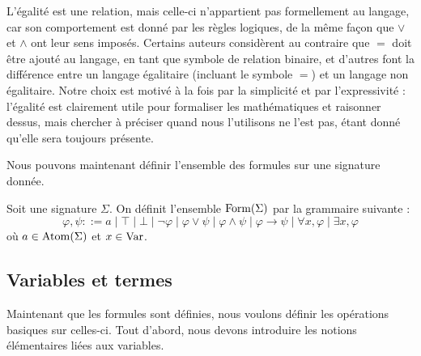 \begin{remark}
  L'égalité est une relation, mais celle-ci n'appartient pas formellement au
  langage, car son comportement est donné par les règles logiques, de la même
  façon que $\lor$ et $\land$ ont leur sens imposés. Certains auteurs considèrent
  au contraire que $=$ doit être ajouté au langage, en tant que symbole de
  relation binaire, et d'autres font la différence entre un langage égalitaire
  (incluant le symbole $=$) et un langage non égalitaire. Notre choix est motivé
  à la fois par la simplicité et par l'expressivité : l'égalité est clairement
  utile pour formaliser les mathématiques et raisonner dessus, mais chercher à
  préciser quand nous l'utilisons ne l'est pas, étant donné qu'elle sera toujours
  présente.
\end{remark}

Nous pouvons maintenant définir l'ensemble des formules sur une signature donnée.

\begin{definition}[Formules]
  Soit une signature $\Sigma$. On définit l'ensemble $\operatorname{Form}(\Sigma)$ par
  la grammaire suivante :
  \[\varphi,\psi ::= a\mid \top\mid\bot\mid\lnot\varphi\mid\varphi\lor\psi\mid
  \varphi\land\psi\mid \varphi\to\psi\mid\forall x,\varphi\mid\exists x,\varphi\]
  où $a\in \operatorname{Atom}(\Sigma)$ et $x\in \operatorname{Var}$.
\end{definition}

\subsection{Variables et termes}

Maintenant que les formules sont définies, nous voulons définir les opérations
basiques sur celles-ci. Tout d'abord, nous devons introduire les notions
élémentaires liées aux variables.

